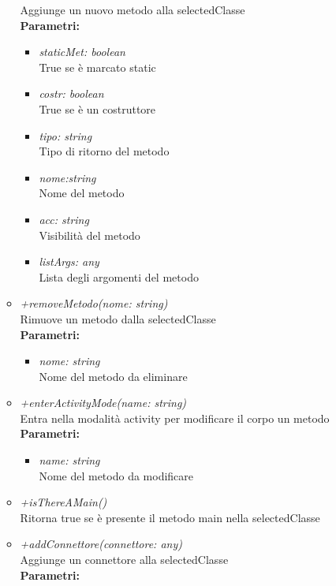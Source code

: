\begin{itemize}
\begin{itemize}
    		Aggiunge un nuovo metodo alla selectedClasse\\
    		\textbf{Parametri:}
    		\begin{itemize}
    			\item \emph{staticMet: boolean}\\
    			True se è marcato static
    			\item \emph{costr: boolean}\\
    			True se è un costruttore
    			\item \emph{tipo: string}\\
    			Tipo di ritorno del metodo
    			\item \emph{nome:string}\\
    			Nome del metodo
    			\item \emph{acc: string}\\
    			Visibilità del metodo
    			\item \emph{listArgs: any}\\
    			Lista degli argomenti del metodo
    		\end{itemize}
    		\item \emph{+removeMetodo(nome: string)}\\
    		Rimuove un metodo dalla selectedClasse\\
    		\textbf{Parametri:}
    		\begin{itemize}
    			\item \emph{nome: string}\\
    			Nome del metodo da eliminare
    		\end{itemize}
    		\item \emph{+enterActivityMode(name: string)}\\
    		Entra nella modalità activity per modificare il corpo un metodo\\
    		\textbf{Parametri:}
    		\begin{itemize}
    			\item \emph{name: string}\\
    			Nome del metodo da modificare
    		\end{itemize}
    		\item \emph{+isThereAMain()}\\
    		Ritorna true se è presente il metodo main nella selectedClasse
    		\item \emph{+addConnettore(connettore: any)}\\
    		Aggiunge un connettore alla selectedClasse\\
    		\textbf{Parametri:}

\end{itemize}
\end{itemize}
